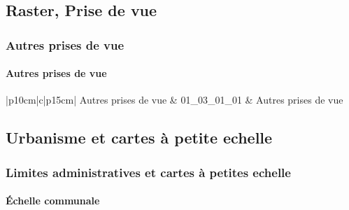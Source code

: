 \documentclass[12pt,titlepage]{book}
\begin{document}

\subsection{Raster, Prise de vue}
\subsubsection{\large Autres prises de vue}
\paragraph{Autres prises de vue}
\noindent
\vspace{\baselineskip}

\renewcommand{\arraystretch}{1.2}
\begin{supertabular}{|p{10cm}|c|p{15cm}|}
 Autres prises de vue & 01\_03\_01\_01 & Autres prises de vue\\
\hline
\end{supertabular}
\subsection{Urbanisme et cartes à petite echelle}
\subsubsection{\large Limites administratives et cartes à petites echelle}
\paragraph{Échelle communale}
\noindent
\vspace{\baselineskip}
\end{document}
